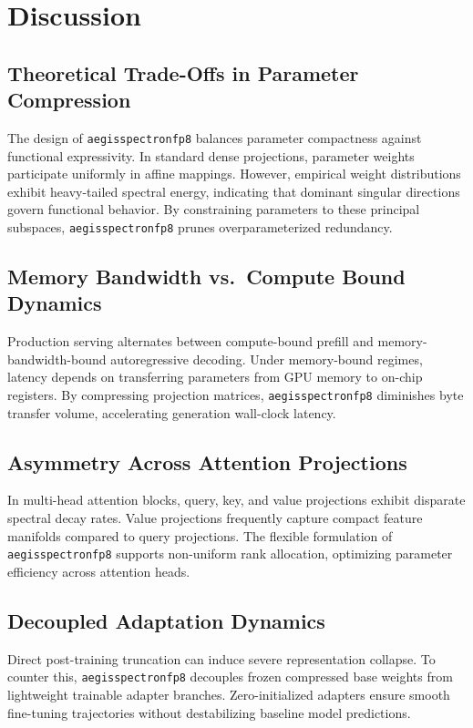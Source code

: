 \section{Discussion}

\subsection{Theoretical Trade-Offs in Parameter Compression}
The design of \texttt{aegisspectronfp8} balances parameter compactness against functional expressivity. In standard dense projections, parameter weights participate uniformly in affine mappings. However, empirical weight distributions exhibit heavy-tailed spectral energy, indicating that dominant singular directions govern functional behavior. By constraining parameters to these principal subspaces, \texttt{aegisspectronfp8} prunes overparameterized redundancy.

\subsection{Memory Bandwidth vs.\ Compute Bound Dynamics}
Production serving alternates between compute-bound prefill and memory-bandwidth-bound autoregressive decoding. Under memory-bound regimes, latency depends on transferring parameters from GPU memory to on-chip registers. By compressing projection matrices, \texttt{aegisspectronfp8} diminishes byte transfer volume, accelerating generation wall-clock latency.

\subsection{Asymmetry Across Attention Projections}
In multi-head attention blocks, query, key, and value projections exhibit disparate spectral decay rates. Value projections frequently capture compact feature manifolds compared to query projections. The flexible formulation of \texttt{aegisspectronfp8} supports non-uniform rank allocation, optimizing parameter efficiency across attention heads.

\subsection{Decoupled Adaptation Dynamics}
Direct post-training truncation can induce severe representation collapse. To counter this, \texttt{aegisspectronfp8} decouples frozen compressed base weights from lightweight trainable adapter branches. Zero-initialized adapters ensure smooth fine-tuning trajectories without destabilizing baseline model predictions.

